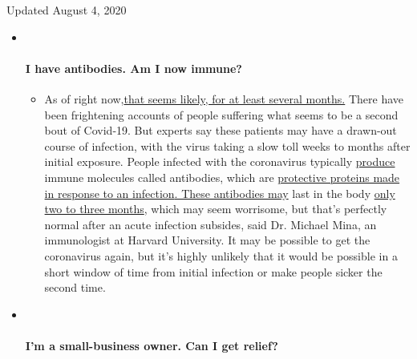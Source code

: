 Updated August 4, 2020

\begin{itemize}
\item ~
  \hypertarget{i-have-antibodies-am-i-now-immune}{%
  \paragraph{I have antibodies. Am I now
  immune?}\label{i-have-antibodies-am-i-now-immune}}

  \begin{itemize}
  \tightlist
  \item
    As of right
    now,\href{https://www.nytimes3xbfgragh.onion/2020/07/22/health/covid-antibodies-herd-immunity.html?action=click\&pgtype=Article\&state=default\&region=MAIN_CONTENT_3\&context=storylines_faq}{that
    seems likely, for at least several months.} There have been
    frightening accounts of people suffering what seems to be a second
    bout of Covid-19. But experts say these patients may have a
    drawn-out course of infection, with the virus taking a slow toll
    weeks to months after initial exposure. People infected with the
    coronavirus typically
    \href{https://www.nature.com/articles/s41586-020-2456-9}{produce}
    immune molecules called antibodies, which are
    \href{https://www.nytimes3xbfgragh.onion/2020/05/07/health/coronavirus-antibody-prevalence.html?action=click\&pgtype=Article\&state=default\&region=MAIN_CONTENT_3\&context=storylines_faq}{protective
    proteins made in response to an
    infection}\href{https://www.nytimes3xbfgragh.onion/2020/05/07/health/coronavirus-antibody-prevalence.html?action=click\&pgtype=Article\&state=default\&region=MAIN_CONTENT_3\&context=storylines_faq}{.
    These antibodies may} last in the body
    \href{https://www.nature.com/articles/s41591-020-0965-6}{only two to
    three months}, which may seem worrisome, but that's perfectly normal
    after an acute infection subsides, said Dr. Michael Mina, an
    immunologist at Harvard University. It may be possible to get the
    coronavirus again, but it's highly unlikely that it would be
    possible in a short window of time from initial infection or make
    people sicker the second time.
  \end{itemize}
\item ~
  \hypertarget{im-a-small-business-owner-can-i-get-relief}{%
  \paragraph{I'm a small-business owner. Can I get
  relief?}\label{im-a-small-business-owner-can-i-get-relief}}


\end{itemize}
